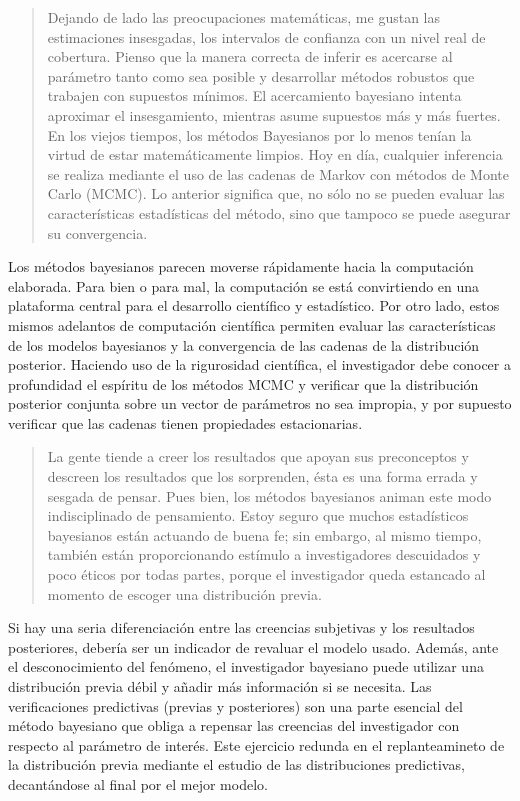 \documentclass[
  10pt,
  spanish,
]{book}
\theoremstyle{definition}
\theoremstyle{definition}
\theoremstyle{definition}
\theoremstyle{definition}
\theoremstyle{remark}
\begin{document}
\begin{quote}
Dejando de lado las preocupaciones matemáticas, me gustan las estimaciones insesgadas, los intervalos de confianza con un nivel real de cobertura. Pienso que la manera correcta de inferir es acercarse al parámetro tanto como sea posible y desarrollar métodos robustos que trabajen con supuestos mínimos. El acercamiento bayesiano intenta aproximar el insesgamiento, mientras asume supuestos más y más fuertes. En los viejos tiempos, los métodos Bayesianos por lo menos tenían la virtud de estar matemáticamente limpios. Hoy en día, cualquier inferencia se realiza mediante el uso de las cadenas de Markov con métodos de Monte Carlo (MCMC). Lo anterior significa que, no sólo no se pueden evaluar las características estadísticas del método, sino que tampoco se puede asegurar su convergencia.
\end{quote}

Los métodos bayesianos parecen moverse rápidamente hacia la computación elaborada. Para bien o para mal, la computación se está convirtiendo en una plataforma central para el desarrollo científico y estadístico. Por otro lado, estos mismos adelantos de computación científica permiten evaluar las características de los modelos bayesianos y la convergencia de las cadenas de la distribución posterior. Haciendo uso de la rigurosidad científica, el investigador debe conocer a profundidad el espíritu de los métodos MCMC y verificar que la distribución posterior conjunta sobre un vector de parámetros no sea impropia, y por supuesto verificar que las cadenas tienen propiedades estacionarias.

\begin{quote}
La gente tiende a creer los resultados que apoyan sus preconceptos y descreen los resultados que los sorprenden, ésta es una forma errada y sesgada de pensar. Pues bien, los métodos bayesianos animan este modo indisciplinado de pensamiento. Estoy seguro que muchos estadísticos bayesianos están actuando de buena fe; sin embargo, al mismo tiempo, también están proporcionando estímulo a investigadores descuidados y poco éticos por todas partes, porque el investigador queda estancado al momento de escoger una distribución previa.
\end{quote}

Si hay una seria diferenciación entre las creencias subjetivas y los resultados posteriores, debería ser un indicador de revaluar el modelo usado. Además, ante el desconocimiento del fenómeno, el investigador bayesiano puede utilizar una distribución previa débil y añadir más información si se necesita. Las verificaciones predictivas (previas y posteriores) son una parte esencial del método bayesiano que obliga a repensar las creencias del investigador con respecto al parámetro de interés. Este ejercicio redunda en el replanteamineto de la distribución previa mediante el estudio de las distribuciones predictivas, decantándose al final por el mejor modelo.
\end{document}
